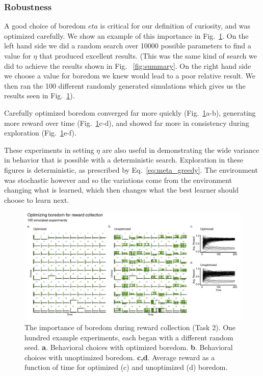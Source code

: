 \subsubsection*{Robustness}
A good choice of boredom $eta$ is critical for our definition of curiosity, and was optimized carefully. We show an example of this importance in Fig.~\ref{fig:boredom2}. On the left hand side we did a random search over 10000 possible parameters to find a value for $\eta$ that produced excellent results. (This was the same kind of search we did to achieve the results shown in Fig. ~\ref{fig:summary}. On the right hand side we choose a value for boredom we knew would lead to a poor relative result. We then ran the 100 different randomly generated simulations which gives us the results seen in Fig.~\ref{fig:boredom2}). 

Carefully optimized boredom converged far more quickly (Fig.~\ref{fig:boredom2}a-b), generating more reward over time (Fig.~\ref{fig:boredom2}c-d), and showed far more in consistency during exploration (Fig.~\ref{fig:boredom2}e-f). 

These experiments in setting $\eta$ are also useful in demonstrating the wide variance in behavior that is possible with a deterministic search. Exploration in these figures is deterministic, as prescribed by Eq.~\ref{eq:meta_greedy}. The environment was stochastic however and so the variations come from the environment changing what is learned, which then changes what the best learner should choose to learn next. 

\begin{figure}
	\begin{fullwidth}
	\includegraphics[width=1.0\linewidth]{img/boredom2.pdf} 
	\caption{The importance of boredom during reward collection (Task 2). One hundred example experiments, each began with a different random seed. 
	\textbf{a}. Behavioral choices with optimized boredom.
	\textbf{b}. Behavioral choices with unoptimized boredom.
	\textbf{c,d}. Average reward as a function of time for optimized (c) and unoptimized (d) boredom.
	}
	\label{fig:boredom2} 
	\end{fullwidth}
\end{figure}

